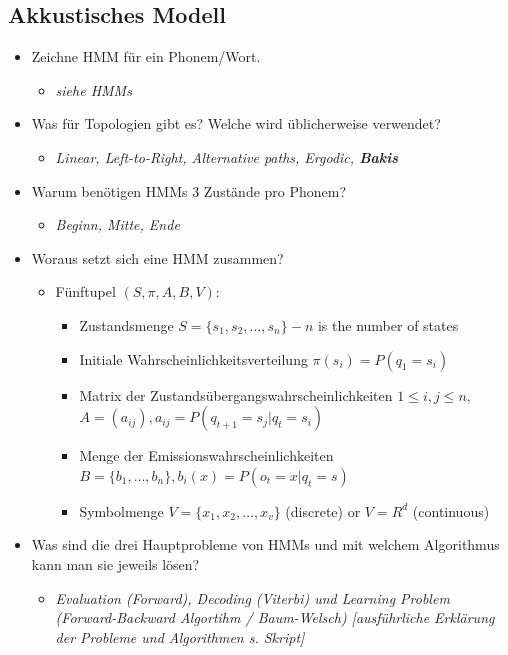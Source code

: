 \documentclass[11pt]{article}
\begin{document}
\subsection{Akkustisches Modell}
\begin{itemize}
\item Zeichne HMM für ein Phonem/Wort.
\begin{itemize}
\item \emph{siehe HMMs}
\end{itemize}
\item Was für Topologien gibt es? Welche wird üblicherweise verwendet?
\begin{itemize}
\item \emph{Linear, Left-to-Right, Alternative paths, Ergodic, \textbf{Bakis}}
\end{itemize}
\item Warum benötigen HMMs 3 Zustände pro Phonem?
\begin{itemize}
\item \emph{Beginn, Mitte, Ende}
\end{itemize}
\item Woraus setzt sich eine HMM zusammen?
\begin{itemize}
\item Fünftupel $(S, \pi, A, B, V)$:
\begin{itemize}
\item Zustandsmenge $S = \{s_1,s_2,\dots,s_n\} - n$ is the number of states
\item Initiale Wahrscheinlichkeitsverteilung $\pi(s_i) = P(q_1 = s_i)$
\item Matrix der Zustandsübergangswahrscheinlichkeiten $1 \le i, j \le n, $\\ $A = (a_{ij}), a_{ij} = P(q_{t+1} = s_j | q_t = s_i)$
\item Menge der Emissionswahrscheinlichkeiten $B = \{b_1, \dots, b_n\}, b_i(x) = P(o_t = x | q_t = s)$
\item Symbolmenge $V = \{x_1,x_2,\dots,x_v\}$ (discrete) or $V = R^d$ (continuous)
\end{itemize}
\end{itemize}
\item Was sind die drei Hauptprobleme von HMMs und mit welchem Algorithmus kann man sie jeweils lösen?
\begin{itemize}
\item \emph{Evaluation (Forward), Decoding (Viterbi) und Learning Problem (Forward-Backward Algortihm / Baum-Welsch) [ausführliche Erklärung der Probleme und Algorithmen s. Skript]}

\end{itemize}
\end{itemize}
\end{document}
